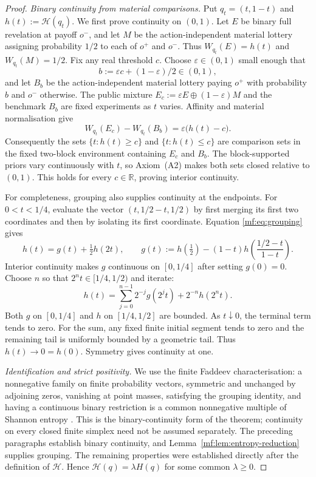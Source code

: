 \documentclass[11pt,a4paper]{article}
\theoremstyle{definition}
\newcommand{\Sh}{H}
\newcommand{\R}{\mathbb R}
\newcommand{\1}{\mathbf 1}
\begin{document}
\begin{proof}
\emph{Binary continuity from material comparisons.}
Put $q_t=(t,1-t)$ and $h(t):=\mathcal H(q_t)$.  We first prove continuity
on $(0,1)$.  Let $E$ be binary full revelation at payoff $o^-$, and let $M$
be the action-independent material lottery assigning probability $1/2$ to
each of $o^+$ and $o^-$.  Thus $W_{q_t}(E)=h(t)$ and $W_{q_t}(M)=1/2$.
Fix any real threshold $c$.  Choose $\varepsilon\in(0,1)$ small enough that
\[
 b:=\varepsilon c+(1-\varepsilon)/2\in(0,1),
\]
and let $B_b$ be the action-independent material lottery paying $o^+$ with
probability $b$ and $o^-$ otherwise.  The public mixture
$E_c:=\varepsilon E\oplus(1-\varepsilon)M$ and the benchmark $B_b$ are
fixed experiments as $t$ varies.  Affinity and material normalisation give
\[
 W_{q_t}(E_c)-W_{q_t}(B_b)
 =\varepsilon\bigl(h(t)-c\bigr).
\]
Consequently the sets $\{t:h(t)\ge c\}$ and $\{t:h(t)\le c\}$ are
comparison sets in the fixed two-block environment containing $E_c$ and
$B_b$.  The block-supported priors vary continuously with $t$, so
Axiom~\textup{(A2)} makes both sets closed relative to $(0,1)$.
This holds for every $c\in\R$, proving interior continuity.

For completeness, grouping also supplies continuity at the endpoints.
For $0<t<1/4$, evaluate the vector $(t,1/2-t,1/2)$ by first merging its
first two coordinates and then by isolating its first coordinate.  Equation
\eqref{mf:eq:grouping} gives
\[
 h(t)=g(t)+\tfrac12h(2t),
 \qquad
 g(t):=h(\tfrac12)-(1-t)
 h\!\left(\frac{1/2-t}{1-t}\right).
\]
Interior continuity makes $g$ continuous on $[0,1/4]$ after setting $g(0)=0$.
Choose $n$ so that $2^nt\in[1/4,1/2)$ and iterate:
\[
 h(t)=\sum_{j=0}^{n-1}2^{-j}g(2^jt)+2^{-n}h(2^nt).
\]
Both $g$ on $[0,1/4]$ and $h$ on $[1/4,1/2]$ are bounded.
As $t\downarrow0$, the terminal term tends to zero.  For the sum, any fixed
finite initial segment tends to zero and the remaining tail is uniformly
bounded by a geometric tail.  Thus $h(t)\to0=h(0)$.  Symmetry gives
continuity at one.

\emph{Identification and strict positivity.}
We use the finite Faddeev characterisation: a nonnegative family on finite
probability vectors, symmetric and unchanged by adjoining zeros, vanishing
at point masses, satisfying the grouping identity, and having a continuous
binary restriction is a common nonnegative multiple of Shannon entropy
\cite{Faddeev1956}.  This is the binary-continuity form of the theorem;
continuity on every closed finite simplex need not be assumed separately.
The preceding paragraphs establish binary continuity, and
Lemma~\ref{mf:lem:entropy-reduction} supplies grouping.  The remaining
properties were established directly after the definition of $\mathcal H$.
Hence $\mathcal H(q)=\lambda\Sh(q)$ for some common $\lambda\ge0$.


\end{proof}
\end{document}
